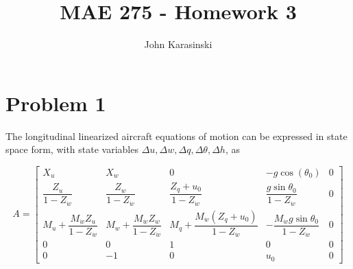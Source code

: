 \documentclass[12pt]{article}
\title{MAE 275 - Homework 3}
\author{John Karasinski}
\begin{document}
\maketitle

\section{Problem 1}
The longitudinal linearized aircraft equations of motion can be expressed in state space form, with state variables $\Delta u, \Delta w, \Delta q, \Delta \theta, \Delta h $, as

\begin{equation*}
A =
\begin{bmatrix}
    X_u & X_w & 0 & -g \cos(\theta_0) & 0 \\
    \dfrac{Z_u}{1-Z_{\dot{w}}} & \dfrac{Z_w}{1-Z_{\dot{w}}} & \dfrac{Z_q + u_0}{1-Z_{\dot{w}}} & \dfrac{g\sin \theta_0}{1-Z_{\dot{w}}} & 0 \\
    M_u + \dfrac{M_{\dot{w}} Z_u}{1-Z_{\dot{w}}} & M_w + \dfrac{M_{\dot{w}} Z_w}{1-Z_{\dot{w}}} & M_q + \dfrac{M_{\dot{w}} (Z_q + u_0)}{1-Z_{\dot{w}}} & -\dfrac{M_{\dot{w}} g\sin \theta_0}{1-Z_{\dot{w}}} & 0 \\
    0 & 0 & 1 & 0 & 0 \\
    0 & -1 & 0 & u_0 & 0
\end{bmatrix}
\end{equation*}
\end{document}
